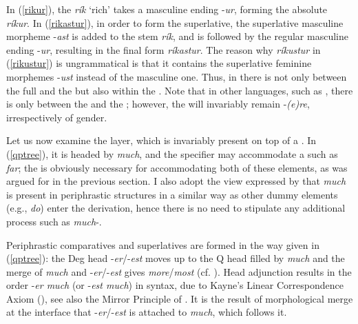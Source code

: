 In (\ref{rikur}), the  \textit{rík} `rich' takes a masculine ending -\textit{ur}, forming the absolute  \textit{ríkur}. In (\ref{rikastur}), in order to form the superlative, the superlative masculine morpheme -\textit{ast} is added to the stem \textit{rík}, and is followed by the regular masculine ending -\textit{ur}, resulting in the final form \textit{ríkastur}. The reason why \textit{ríkustur} in (\ref{rikustur}) is ungrammatical is that it contains the superlative feminine morphemes -\textit{ust} instead of the masculine one. Thus, in  there is not only  between the full  and the  but also within the . Note that in other  languages, such as , there is  only between the  and the ; however, the   will invariably remain -\textit{(e)re}, irrespectively of gender.

Let us now examine the  layer, which is invariably present on top of a . In (\ref{qptree}), it is headed by \textit{much}, and the specifier may accommodate a   such as \textit{far}; the  is obviously necessary for accommodating both of these elements, as was argued for in the previous section. I also adopt the view expressed by \citet{corver1997} that \textit{much} is present in periphrastic structures in a similar way as other dummy elements (e.g., \textit{do}) enter the derivation, hence there is no need to stipulate any additional process such as \textit{much}-.

Periphrastic comparatives and superlatives are formed in the way given in (\ref{qptree}): the Deg head -\textit{er}/-\textit{est} moves up to the Q head filled by \textit{much} and the merge of \textit{much} and -\textit{er}/-\textit{est} gives \textit{more}/\textit{most} (cf. \citealt{bresnan1973, corver1997, beck2011, kantor2008}). Head adjunction results in the order -\textit{er much} (or -\textit{est much}) in syntax, due to Kayne's Linear Correspondence Axiom (\citealt{kayne1994}), see also the Mirror Principle of \citet{baker1985, baker1988}. It is the result of morphological merge at the  interface that -\textit{er}/-\textit{est} is attached to \textit{much}, which follows it.


